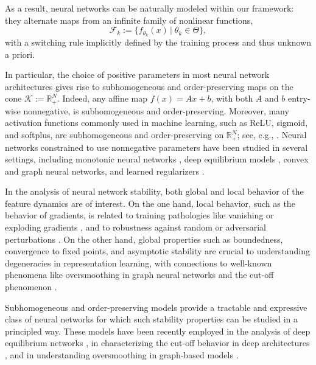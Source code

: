 \documentclass{article}
\newcommand{\R}{\mathbb{R}}
\newcommand{\family}{\mathcal{F}}
\newcommand{\cone}{\mathcal{K}}
\begin{document}
As a result, neural networks can be naturally modeled within our framework: they alternate maps from an infinite family of nonlinear functions,
\begin{equation}
    \family_k := \{f_{\theta_k}(x)\,|\; \theta_k \in \Theta\},
\end{equation}
with a switching rule implicitly defined by the training process and thus unknown a priori.
%

In particular,  the choice of positive parameters in most neural network architectures gives rise to subhomogeneous and order-preserving maps on the cone $\cone:=\R_+^N$.
Indeed, any affine map $f(x)=Ax+b$, with both $A$ and $b$ entry-wise nonnegative, is subhomogeneous and order-preserving. Moreover, many activation functions commonly used in machine learning, such as ReLU, sigmoid, and softplus, are subhomogeneous and order-preserving on $\R_+^N$; see, e.g., \cite{sittonisubhomogeneous, piotrowski2024fixed}.
Neural networks constrained to use nonnegative parameters have been studied in several settings, including monotonic neural networks \cite{archer1993application, sill1997monotonic, daniels_monotone2010}, deep equilibrium models \cite{piotrowski2024fixed}, convex and graph neural networks, and learned regularizers \cite{mukherjee2020learned, zhang2025rethinking}.

%
%
In the analysis of neural network stability, both global and local behavior of the feature dynamics are of interest. On the one hand, local behavior, such as the behavior of gradients, is related to training pathologies like vanishing or exploding gradients \cite{pascanu2013difficulty}, and to robustness against random or adversarial perturbations \cite{szegedy2014adversarial}. On the other hand, global properties such as boundedness, convergence to fixed points, and asymptotic stability are crucial to understanding degeneracies in representation learning, with connections to well-known phenomena like oversmoothing in graph neural networks \cite{Li_Han_Wu_2018} and the cut-off phenomenon \cite{avelin2022deep}.

Subhomogeneous and order-preserving models provide a tractable and expressive class of neural networks for which such stability properties can be studied in a principled way. These models have been recently employed in the analysis of deep equilibrium networks \cite{sittonisubhomogeneous, piotrowski2024fixed}, in characterizing the cut-off behavior in deep architectures \cite{avelin2022deep}, and in understanding oversmoothing in graph-based models \cite{zhang2025rethinking}.
\end{document}
